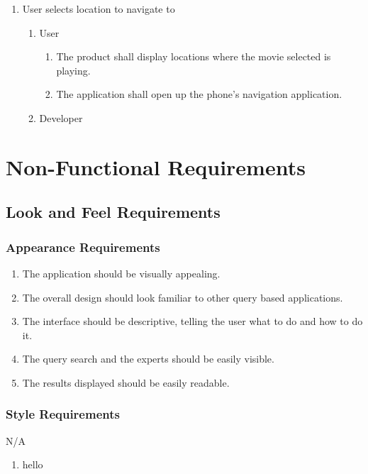 \documentclass[]{article}
\begin{document}
\begin{enumerate}[{BE}1.]
	\item User selects location to navigate to
	\begin{enumerate}[{VP3}.1]
		\item User
			\begin{enumerate}
				\item The product shall display locations where the movie selected is playing.
				\item The application shall open up the phone’s navigation application.
			\end{enumerate}
		\item Developer
	\end{enumerate}
\end{enumerate}



\section{Non-Functional Requirements}
\label{sec:non-functional_requirements}
\subsection{Look and Feel Requirements}
\label{sub:look_and_feel_requirements}


\subsubsection{Appearance Requirements}
\label{ssub:appearance_requirements}
\begin{enumerate}[{LF}1. ]
	\item The application should be visually appealing.
	\item The overall design should look familiar to other query based applications.
	\item The interface should be descriptive, telling the user what to do and how to do it.
	\item The query search and the experts should be easily visible.
	\item The results displayed should be easily readable.
	\setcounter{placeholder}{\theenumi}
\end{enumerate}

\subsubsection{Style Requirements}
\label{ssub:style_requirements}
N/A
\begin{enumerate}
	\item hello
\end{enumerate}
\end{document}
